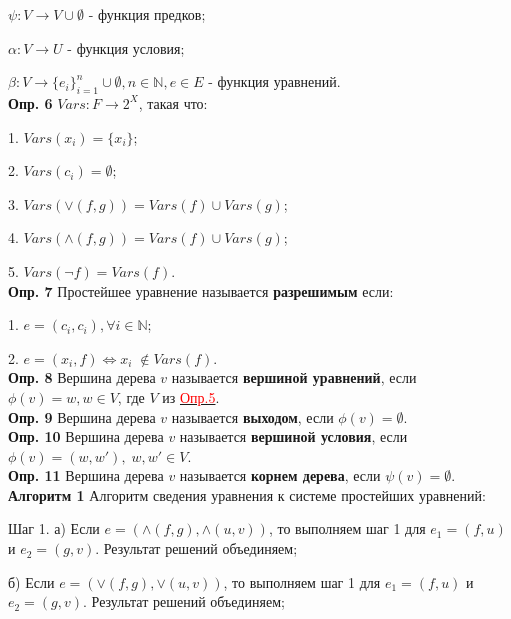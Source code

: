 \documentclass[12pt]{article}
\begin{document}
      $\psi : V \rightarrow V \cup \emptyset$ - функция предков;
      
      $\alpha : V \rightarrow U$ - функция условия;
      
      $\beta : V \rightarrow \lbrace  e_{i}  \rbrace_{i=1}^{n} \cup \emptyset, n \in \mathbb{N}, e \in E $ - функция уравнений.
     \\ 
        
     {\bf Опр. 6} $Vars:F \rightarrow 2^{X}$, такая что:
     
     1. $Vars(x_{i})= \lbrace x_{i} \rbrace$;
     
     2. $Vars(c_{i})=  \emptyset$;
     
     3. $Vars(\vee(f,g))= Vars(f)\cup Vars(g)$;
     
     4. $Vars(\wedge(f,g))= Vars(f)\cup Vars(g)$;
     
     5. $Vars(\neg f)= Vars(f)$.
     \\
     
     {\bf Опр. 7} Простейшее уравнение называется {\bf разрешимым} если:
     
     1. $e =(c_{i},c_{i}), \forall i \in \mathbb{N}$;
     
     2. $e =(x_{i},f) \Leftrightarrow x_{i} \;\notin Vars(f)$.
     \\
     
      {\bf Опр. 8} Вершина дерева $v$ называется {\bf вершиной уравнений}, если
     $\phi(v)=w , w \in V$, где $V$ из \hyperlink{d5}{ \textcolor{red}{Опр.5}}.
     \\
     
     {\bf Опр. 9} Вершина дерева $v$ называется {\bf выходом}, если
     $\phi(v)= \emptyset$.
     \\
     
     {\bf Опр. 10} Вершина дерева $v$ называется {\bf вершиной условия}, если
     $\phi(v)=(w,w') ,\; w,w' \in V$.
     \\
     
     {\bf Опр. 11}  Вершина дерева $v$ называется {\bf корнем дерева}, если
     $\psi(v) = \emptyset$.
     \\
     
     \hypertarget{a1}{{\bf Алгоритм 1}}
     Алгоритм сведения уравнения к системе простейших уравнений:
     
     Шаг 1. а) Если $e=(\wedge(f,g),\wedge(u,v))$, то выполняем шаг 1 для $e_{1}=(f,u)$ и $e_{2}=(g,v)$. Результат решений объединяем;
     
     б) Если $e=(\vee(f,g),\vee(u,v))$, то выполняем шаг 1 для $e_{1}=(f,u)$ и $e_{2}=(g,v)$. Результат решений объединяем;
     
\end{document}
